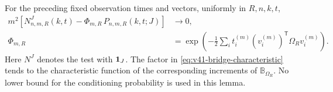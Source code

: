 \begin{lemma}
\label{lem:v41-pinned-factorization}
For the preceding fixed observation times and vectors, uniformly in
$R,n,k,t$,
\begin{align}
 m^2\left[N^J_{n,m,R}(k,t)
     -\Phi_{m,R}\,P_{n,m,R}(k,t;J)\right]&\longrightarrow0,
                                      \label{eq:v41-pinned-factorization}\\
 \Phi_{m,R}
   &=\exp\left(-\frac12\sum_i t_i^{(m)}
           (v_i^{(m)})^{\mathsf T}\Omega_Rv_i^{(m)}\right).
                                      \label{eq:v41-bridge-characteristic}
\end{align}
Here $N^J$ denotes the test with $\mathbf1_J$. The factor in
\eqref{eq:v41-bridge-characteristic} tends to the characteristic
function of the corresponding increments of $\mathbb B_{\Omega_R}$.
No lower bound for the conditioning probability is used in this lemma.
\end{lemma}
